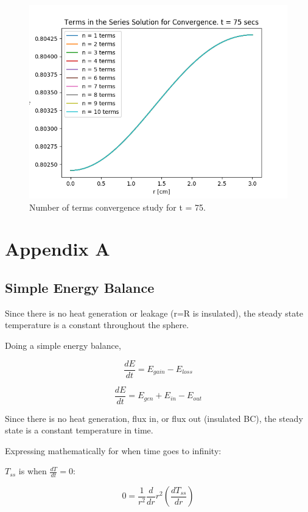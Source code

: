 \documentclass[12pt,letterpaper]{article}
\begin{document}
\begin{figure}[htbp!]
  \begin{center}
    \includegraphics[scale=0.7]{terms_75.png}
  \end{center}
  \caption{Number of terms convergence study for t = 75.}
  \label{fig:75}
\end{figure}


\pagebreak

\section{Appendix A}

\subsection{Simple Energy Balance}
Since there is no heat generation or leakage (r=R is insulated), 
the steady state temperature is a constant throughout the sphere.

Doing a simple energy balance,

\[\frac{dE}{dt} = E_{gain} - E_{loss}\]

\[\frac{dE}{dt} = E_{gen} + E_{in} - E_{out}\]

Since there is no heat generation, flux in, or flux out (insulated BC),
the steady state is a constant temperature in time.


Expressing mathematically for when time goes to infinity:

$T_{ss}$ is when $\frac{dT}{dt} = 0 $:

\[0 = \frac{1}{r^2} \frac{d}{dr} r^2 (\frac{dT_{ss}}{dr})\]
\end{document}
